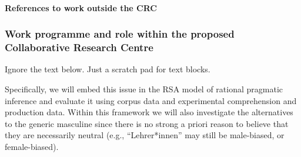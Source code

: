 \documentclass[11pt]{article}
\begin{document}
\paragraph{References to work outside the CRC}


\printbibliography[heading=none,notkeyword={TMJT-own},notkeyword={TMJT-own-other}]

\subsubsection{Work programme and role within the proposed Collaborative Research Centre}

%
%
%
%
%
%
%
%
%
%
%

Ignore the text below.  Just a scratch pad for text blocks.

Specifically, we will embed this issue in the RSA model of rational pragmatic inference and evaluate it using corpus data and experimental comprehension and production data.  Within this framework we will also investigate the alternatives to the generic masculine since there is no strong a priori reason to believe that they are necessarily neutral (e.g., “Lehrer*innen” may still be male-biased, or female-biased).
\end{document}
